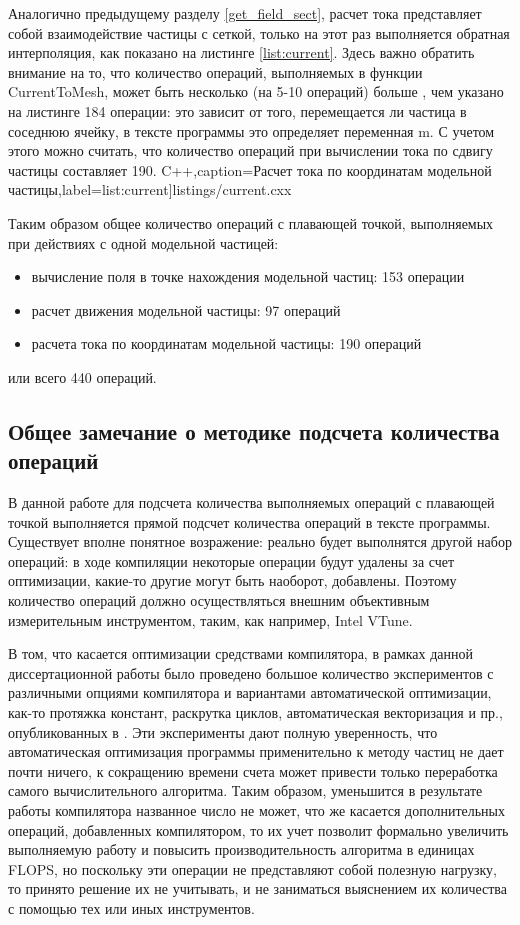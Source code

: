 Аналогично предыдущему разделу \ref{get_field_sect}, расчет тока представляет собой взаимодействие частицы с сеткой, только на этот раз выполняется обратная интерполяция, как показано на листинге \ref{list:current}. Здесь важно обратить внимание на то, что количество операций, выполняемых в функции CurrentToMesh, может быть несколько (на 5-10 операций) больше , чем указано на листинге 184 операции: это зависит от того, перемещается ли частица в соседнюю ячейку, в тексте программы это определяет переменная  m. С учетом этого можно считать, что количество операций при вычислении тока по сдвигу частицы составляет 190.
\begingroup
\captiondelim{ } %
C++},caption={Расчет тока по координатам модельной частицы},label={list:current}]{listings/current.cxx}
\endgroup  

Таким образом общее количество операций с плавающей точкой, выполняемых при действиях с одной модельной частицей:
\begin{itemize}
	\item вычисление поля в точке нахождения модельной частиц: 153 операции
	\item расчет движения модельной частицы: 97 операций
	\item расчета тока по координатам модельной частицы: 190 операций
\end{itemize} 
или всего 440 операций.

\subsection{Общее замечание о методике подсчета количества операций}

В данной работе для подсчета количества выполняемых операций с плавающей точкой выполняется прямой подсчет количества операций в тексте программы. Существует вполне понятное возражение: реально будет выполнятся другой набор операций: в ходе компиляции некоторые операции будут удалены за счет оптимизации, какие-то другие могут быть наоборот, добавлены. Поэтому количество операций должно осуществляться внешним объективным измерительным инструментом, таким, как например, Intel VTune.  

В том, что касается оптимизации средствами компилятора, в рамках данной диссертационной работы было проведено большое количество экспериментов с различными опциями компилятора и вариантами автоматической оптимизации, как-то протяжка констант, раскрутка циклов, автоматическая векторизация и пр., опубликованных в \cite{MohographyTarkov,MatMod,VychMethProgExa}. Эти эксперименты дают полную уверенность, что автоматическая оптимизация программы применительно к методу частиц не дает почти ничего, к сокращению времени счета может привести только переработка самого вычислительного алгоритма. Таким образом, уменьшится в результате работы компилятора названное число не может, что же касается дополнительных операций, добавленных компилятором, то их учет позволит формально увеличить выполняемую работу и повысить производительность алгоритма в единицах FLOPS, но поскольку эти операции не представляют собой полезную нагрузку, то принято решение их не учитывать, и не заниматься выяснением их количества с помощью тех или иных инструментов.    	  

